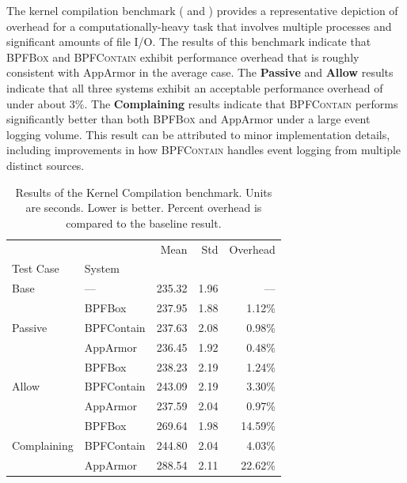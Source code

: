 \documentclass[
  fontsize=12pt,
  titlepage=firstiscover,
  paper=letter,
oneside,
  cleardoublepage=plain,
  parskip=half-,
  DIV=10,
  parindent,
  appendixprefix,
  chapterprefix,
  listof=totoc,
]{scrbook}
\newcommand{\bpfbox}{\textsc{BPFBox}}
\newcommand{\bpfcontain}{\textsc{BPFContain}}
\begin{document}
The kernel compilation benchmark ( and
) provides a representative depiction of overhead for
a computationally-heavy task that involves multiple processes and significant amounts of
file I/O. The results of this benchmark indicate that \bpfbox{} and \bpfcontain{} exhibit
performance overhead that is roughly consistent with AppArmor in the average case. The
\textbf{Passive} and \textbf{Allow} results indicate that all three systems exhibit an
acceptable performance overhead of under about $3\%$. The \textbf{Complaining} results
indicate that \bpfcontain{} performs significantly better than both \bpfbox{} and AppArmor
under a large event logging volume. This result can be attributed to minor implementation
details, including improvements in how \bpfcontain{} handles event logging from multiple
distinct sources.


\begin{table}[ht!]
\centering
\footnotesize
\caption[Results of the Kernel Compilation benchmark]{Results of the Kernel Compilation benchmark. Units are seconds. Lower is better. Percent overhead is compared to the baseline result.}
\label{tab:phoronix-kernel-compilation}
\begin{tabular}{llrrr}
\toprule
            &          &    Mean &   Std & Overhead \\
Test Case & System &         &       &          \\
\midrule
Base & --- &  235.32 &  1.96 &      --- \\
\cline{1-5}
\multirow{3}{*}{Passive} & BPFBox &  237.95 &  1.88 &   1.12\% \\
            & BPFContain &  237.63 &  2.08 &   0.98\% \\
            & AppArmor &  236.45 &  1.92 &   0.48\% \\
\cline{1-5}
\multirow{3}{*}{Allow} & BPFBox &  238.23 &  2.19 &   1.24\% \\
            & BPFContain &  243.09 &  2.19 &   3.30\% \\
            & AppArmor &  237.59 &  2.04 &   0.97\% \\
\cline{1-5}
\multirow{3}{*}{Complaining} & BPFBox &  269.64 &  1.98 &  14.59\% \\
            & BPFContain &  244.80 &  2.04 &   4.03\% \\
            & AppArmor &  288.54 &  2.11 &  22.62\% \\
\bottomrule
\end{tabular}
\end{table}
 
\end{document}
